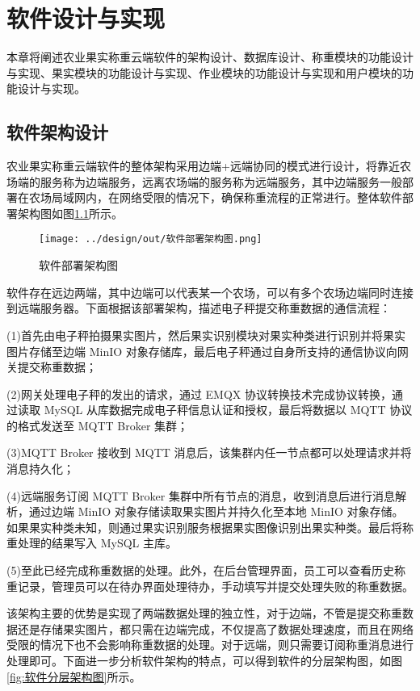 \chapter{软件设计与实现}

本章将阐述农业果实称重云端软件的架构设计、数据库设计、称重模块的功能设计与实现、果实模块的功能设计与实现、作业模块的功能设计与实现和用户模块的功能设计与实现。

\section{软件架构设计}\label{sec:architecture}

农业果实称重云端软件的整体架构采用边端+远端协同的模式进行设计，将靠近农场端的服务称为边端服务，远离农场端的服务称为远端服务，其中边端服务一般部署在农场局域网内，在网络受限的情况下，确保称重流程的正常进行。整体软件部署架构图如图\ref{fig:软件部署架构图}所示。

\begin{figure}
    \centering
    \texttt{[image: ../design/out/软件部署架构图.png]}
    \caption{软件部署架构图}
    \label{fig:软件部署架构图}
\end{figure}

软件存在远边两端，其中边端可以代表某一个农场，可以有多个农场边端同时连接到远端服务器。下面根据该部署架构，描述电子秤提交称重数据的通信流程：

(1)首先由电子秤拍摄果实图片，然后果实识别模块对果实种类进行识别并将果实图片存储至边端 MinIO 对象存储库，最后电子秤通过自身所支持的通信协议向网关提交称重数据；

(2)网关处理电子秤的发出的请求，通过 EMQX 协议转换技术完成协议转换，通过读取 MySQL 从库数据完成电子秤信息认证和授权，最后将数据以 MQTT 协议的格式发送至 MQTT Broker 集群；

(3)MQTT Broker 接收到 MQTT 消息后，该集群内任一节点都可以处理请求并将消息持久化；

(4)远端服务订阅 MQTT Broker 集群中所有节点的消息，收到消息后进行消息解析，通过边端 MinIO 对象存储读取果实图片并持久化至本地 MinIO 对象存储。如果果实种类未知，则通过果实识别服务根据果实图像识别出果实种类。最后将称重处理的结果写入 MySQL 主库。

(5)至此已经完成称重数据的处理。此外，在后台管理界面，员工可以查看历史称重记录，管理员可以在待办界面处理待办，手动填写并提交处理失败的称重数据。

该架构主要的优势是实现了两端数据处理的独立性，对于边端，不管是提交称重数据还是存储果实图片，都只需在边端完成，不仅提高了数据处理速度，而且在网络受限的情况下也不会影响称重数据的处理。对于远端，则只需要订阅称重消息进行处理即可。下面进一步分析软件架构的特点，可以得到软件的分层架构图，如图\ref{fig:软件分层架构图}所示。

